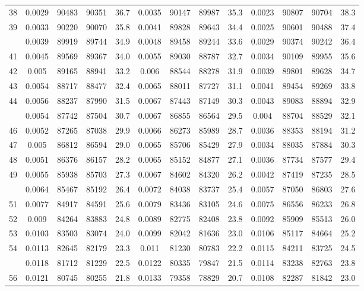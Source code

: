\documentclass[
  14pt,
]{article}
\begin{document}
\begin{longtable}[t]{lcccccccccccc}
38 & 0.0029 & 90483 & 90351 & 36.7 & 0.0035 & 90147 & 89987 & 35.3 & 0.0023 & 90807 & 90704 & 38.3\\
39 & 0.0033 & 90220 & 90070 & 35.8 & 0.0041 & 89828 & 89643 & 34.4 & 0.0025 & 90601 & 90488 & 37.4\\
\addlinespace
40 & 0.0039 & 89919 & 89744 & 34.9 & 0.0048 & 89458 & 89244 & 33.6 & 0.0029 & 90374 & 90242 & 36.4\\
41 & 0.0045 & 89569 & 89367 & 34.0 & 0.0055 & 89030 & 88787 & 32.7 & 0.0034 & 90109 & 89955 & 35.6\\
42 & 0.005 & 89165 & 88941 & 33.2 & 0.006 & 88544 & 88278 & 31.9 & 0.0039 & 89801 & 89628 & 34.7\\
43 & 0.0054 & 88717 & 88477 & 32.4 & 0.0065 & 88011 & 87727 & 31.1 & 0.0041 & 89454 & 89269 & 33.8\\
44 & 0.0056 & 88237 & 87990 & 31.5 & 0.0067 & 87443 & 87149 & 30.3 & 0.0043 & 89083 & 88894 & 32.9\\
\addlinespace
45 & 0.0054 & 87742 & 87504 & 30.7 & 0.0067 & 86855 & 86564 & 29.5 & 0.004 & 88704 & 88529 & 32.1\\
46 & 0.0052 & 87265 & 87038 & 29.9 & 0.0066 & 86273 & 85989 & 28.7 & 0.0036 & 88353 & 88194 & 31.2\\
47 & 0.005 & 86812 & 86594 & 29.0 & 0.0065 & 85706 & 85429 & 27.9 & 0.0034 & 88035 & 87884 & 30.3\\
48 & 0.0051 & 86376 & 86157 & 28.2 & 0.0065 & 85152 & 84877 & 27.1 & 0.0036 & 87734 & 87577 & 29.4\\
49 & 0.0055 & 85938 & 85703 & 27.3 & 0.0067 & 84602 & 84320 & 26.2 & 0.0042 & 87419 & 87235 & 28.5\\
\addlinespace
50 & 0.0064 & 85467 & 85192 & 26.4 & 0.0072 & 84038 & 83737 & 25.4 & 0.0057 & 87050 & 86803 & 27.6\\
51 & 0.0077 & 84917 & 84591 & 25.6 & 0.0079 & 83436 & 83105 & 24.6 & 0.0075 & 86556 & 86233 & 26.8\\
52 & 0.009 & 84264 & 83883 & 24.8 & 0.0089 & 82775 & 82408 & 23.8 & 0.0092 & 85909 & 85513 & 26.0\\
53 & 0.0103 & 83503 & 83074 & 24.0 & 0.0099 & 82042 & 81636 & 23.0 & 0.0106 & 85117 & 84664 & 25.2\\
54 & 0.0113 & 82645 & 82179 & 23.3 & 0.011 & 81230 & 80783 & 22.2 & 0.0115 & 84211 & 83725 & 24.5\\
\addlinespace
55 & 0.0118 & 81712 & 81229 & 22.5 & 0.0122 & 80335 & 79847 & 21.5 & 0.0114 & 83238 & 82763 & 23.8\\
56 & 0.0121 & 80745 & 80255 & 21.8 & 0.0133 & 79358 & 78829 & 20.7 & 0.0108 & 82287 & 81842 & 23.0\\

\end{longtable}
\end{document}

